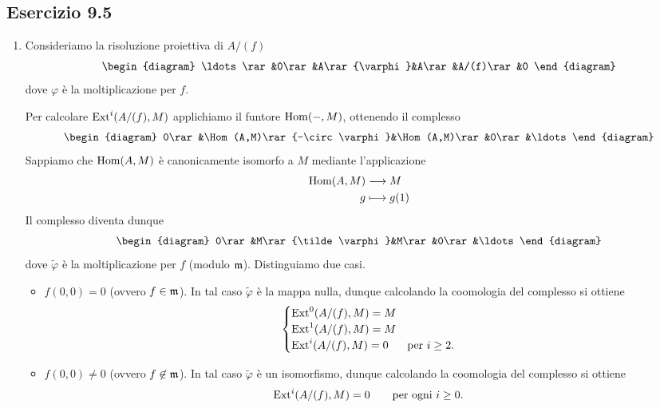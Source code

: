 \documentclass[a4paper]{article}
\begin{document}
\subsection*{Esercizio 9.5}
\begin{enumerate}[(1)]
\item Consideriamo la risoluzione proiettiva di $A/(f)$
$$
\begin{diagram}
\ldots\rar&0\rar&A\rar{\varphi}&A\rar&A/(f)\rar&0
\end{diagram}
$$
dove $\varphi$ è la moltiplicazione per $f$.

Per calcolare $\operatorname{Ext}^i(A/(f),M)$ applichiamo il funtore $\operatorname{Hom}(-,M)$, ottenendo il complesso
$$
\begin{diagram}
0\rar&\Hom(A,M)\rar{-\circ\varphi}&\Hom(A,M)\rar&0\rar&\ldots
\end{diagram}
$$
Sappiamo che $\operatorname{Hom}(A,M)$ è canonicamente isomorfo a $M$ mediante l'applicazione
\begin{align*}
\operatorname{Hom}(A,M)&\longrightarrow M\\
g&\longmapsto g(1)
\end{align*}
Il complesso diventa dunque
$$
\begin{diagram}
0\rar&M\rar{\tilde\varphi}&M\rar&0\rar&\ldots
\end{diagram}
$$
dove $\tilde\varphi$ è la moltiplicazione per $f$ (modulo $\mathfrak{m}$). Distinguiamo due casi.
\begin{itemize}
\item $f(0,0)=0$ (ovvero $f\in\mathfrak{m}$). In tal caso $\tilde\varphi$ è la mappa nulla, dunque calcolando la coomologia del complesso si ottiene
$$
\begin{cases}
\operatorname{Ext}^0(A/(f),M)=M\\
\operatorname{Ext}^1(A/(f),M)=M\\
\operatorname{Ext}^i(A/(f),M)=0&\text{per $i\ge 2$}.
\end{cases}
$$
\item $f(0,0)\neq0$ (ovvero $f\not\in\mathfrak{m}$). In tal caso $\tilde\varphi$ è un isomorfismo, dunque calcolando la coomologia del complesso si ottiene
$$
\operatorname{Ext}^i(A/(f),M)=0\qquad\text{per ogni $i\ge 0$}.
$$
\end{itemize}


\end{enumerate}
\end{document}
